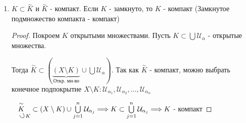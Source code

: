 \begin{theorem-non}
\begin{enumerate}
\begin{proof}
            Проверим, что дополнение $K$ открыто. Возьмем $a \notin K$ и покажем, что 
            $B_r(a) \subset X \setminus K$ для некоторого $r > 0$. Для $x \in K$ возьмем шарик $B_{\rho(x, a)/2}(x) =: \mathcal{U}_x$
            - открытое множество $\mathcal{U}_x \cap B_{\rho(x, a)/2}(a) \neq \varnothing \Longrightarrow K \subset \bigcup\limits_{x \in K} \mathcal{U}_x$.
            Так как $K$ - компакт, можно вырбрать $\mathcal{U}_{x_1}, \mathcal{U}_{x_2}, \dots, \mathcal{U}_{x_n}$, такие что $K \subset \bigcup\limits_{j = 1}^{n} \mathcal{U}_{x_j}
            \quad \mathcal{U}_{x_j} \cap B_{r_j}(a) = \varnothing, \; r_j = \rho(x_j, a)/2$. Если $r = min \ r_j$, то $\mathcal{U}_{x_j} \cap B_{r}(a) = \varnothing \Longrightarrow K \cap B_r(a) = \varnothing 
            \Longrightarrow B_r(a) \subset X \setminus K$ 

            Теперь проверим ограниченность. Возьмем $a \in X$. Тогда $K \subset \bigcup\limits_{n = 1}^{\infty} B_n(a)$.
            Если $x \in K$, то расстрояние между $x$ и $a$ будет конечным, а значит есть такой натуральный номер, который больше, 
            чем это расстояние $\Longrightarrow x \in B_n(a)$. Так как $K$ - компакт, можно выбрать конечное подпокрытие 
            $B_1(a), \dots, B_n(a) \qquad K \subset \bigcup\limits_{j = 1}^{n} B_j(a) = B_n(a) \Longrightarrow K$ содержится в каком то шаре $\Longrightarrow K$ - ограниченное множество 
        \end{proof}
        \item $K \subset \overset{\mathtt{\sim}}{K}$ и $\overset{\mathtt{\sim}}{K}$ - компакт. Если $K$ - замкнуто, то $K$ - компакт
        (Замкнутое подмножество компакта - компакт)
        \begin{proof} \quad

            Покроем $K$ открытыми множествами. Пусть $K \subset \bigcup \mathcal{U}_{\alpha}$ - открытые множества. 
            
            Тогда $\overset{\mathtt{\sim}}{K} \subset (\underbrace{(X \setminus K)}_{\text{Откр. мн-во}} \cup \bigcup \mathcal{U}_{\alpha})$.
            Так как $\overset{\mathtt{\sim}}{K}$ - компакт, можно выбрать конечное подпокрытие $X \setminus K: \mathcal{U}_{\alpha_1}, \mathcal{U}_{\alpha_2}, \dots, \mathcal{U}_{\alpha_n}$

            $\underset{\quad \rotatebox[origin=c]{120}{$ \subset $} K}{\overset{\mathtt{\sim}}{K}} \subset (X \setminus K) \cup \bigcup\limits_{j = 1}^{n} \mathcal{U}_{\alpha_j} \Longrightarrow K \subset \bigcup\limits_{j = 1}^{n} \mathcal{U}_{\alpha_j} \Longrightarrow K$ - компакт
            
        \end{proof}
        
    \end{enumerate}

\end{theorem-non}